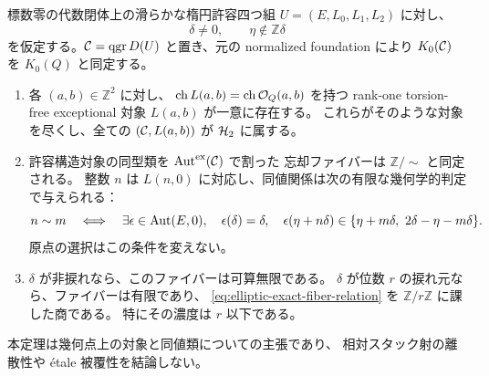 \begin{theorem}[楕円型の全標識と忘却ファイバー]
\label{thm:elliptic-marking-lattice-fiber}
標数零の代数閉体上の滑らかな楕円許容四つ組
$U=(E,L_0,L_1,L_2)$ に対し、
\begin{equation}\label{eq:elliptic-nonresonance}
 \delta\ne0,\qquad \eta\notin\mathbb Z\delta
\end{equation}
を仮定する。$\mathcal C=\operatorname{qgr} D(U)$ と置き、元の normalized foundation により
$K_0(\mathcal C)$ を $K_0(Q)$ と同定する。
\begin{enumerate}
\item 各 $(a,b)\in\mathbb Z^2$ に対し、
$\operatorname{ch}L(a,b)=\operatorname{ch}\mathcal O_Q(a,b)$ を持つ
rank-one torsion-free exceptional 対象 $L(a,b)$ が一意に存在する。
これらがそのような対象を尽くし、全ての $(\mathcal C,L(a,b))$ が $\mathcal H_2$ に属する。
\item 許容構造対象の同型類を $\operatorname{Aut}^{\mathrm{ex}}(\mathcal C)$ で割った
忘却ファイバーは $\mathbb Z/{\sim}$ と同定される。
整数 $n$ は $L(n,0)$ に対応し、同値関係は次の有限な幾何学的判定で与えられる：
\begin{equation}\label{eq:elliptic-exact-fiber-relation}
 n\sim m
 \quad\Longleftrightarrow\quad
 \exists\epsilon\in\operatorname{Aut}(E,0),\quad
 \epsilon(\delta)=\delta,\quad
 \epsilon(\eta+n\delta)\in
 \{\eta+m\delta,\ 2\delta-\eta-m\delta\}.
\end{equation}
原点の選択はこの条件を変えない。
\item $\delta$ が非捩れなら、このファイバーは可算無限である。
$\delta$ が位数 $r$ の捩れ元なら、ファイバーは有限であり、
\eqref{eq:elliptic-exact-fiber-relation} を $\mathbb Z/r\mathbb Z$ に課した商である。
特にその濃度は $r$ 以下である。
\end{enumerate}
本定理は幾何点上の対象と同値類についての主張であり、
相対スタック射の離散性や étale 被覆性を結論しない。
\end{theorem}
